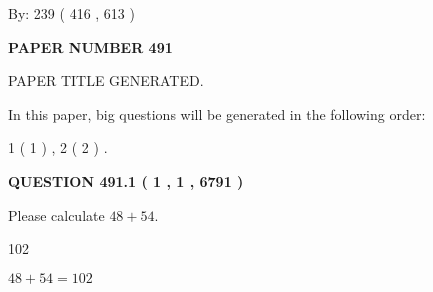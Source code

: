 \documentclass[12pt]{article}
\begin{document}
   
\hspace{1.0in} By: 
 239 ( 416 ,  613 )
   
   
   
   
\newpage 
\setcounter{page}{ 
   491001 } 
   
   
   
   
 {\textbf{ \Large{ PAPER NUMBER  491  }}}
   
   
\vspace{0.2in}
   
   
   
   
   
   
   
   
 \vspace{0.2in}
 
 
 
 
   
   
 PAPER TITLE GENERATED.
   
   
   
\vspace{0.2in}
   
In this paper, big questions will be generated in the following order: 
   
   
   1 ( 1 )
 ,
   2 ( 2 )
 .
  
\vspace{0.2in}
  
{\textbf{\Large{QUESTION
491.1 
 ( 1 , 1 , 6791 )
}}}
  
  
 
Please calculate $ %
48 +  %
54 $.
 
 
 
\noindent{}
 
 

102
 
 
\noindent{}
 
 

 
 
 
\noindent{}
 
 

$ %
48 +  %
54=   %
102$
 
 
\noindent{}
 
\end{document}
